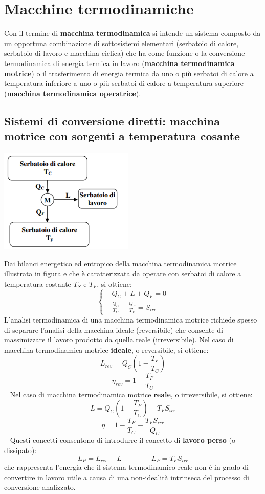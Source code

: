 \section{Macchine termodinamiche}
Con il termine di \textbf{macchina termodinamica} si intende un sistema composto da un opportuna
combinazione di sottosistemi elementari (serbatoio di calore, serbatoio di lavoro e macchina
ciclica) che ha come funzione o la conversione termodinamica di energia termica in lavoro
(\textbf{macchina termodinamica motrice}) o il trasferimento di energia termica da uno o più serbatoi
di calore a temperatura inferiore a uno o più serbatoi di calore a temperatura superiore
(\textbf{macchina termodinamica operatrice}). 
\subsection{Sistemi di conversione diretti: macchina motrice con sorgenti a temperatura cosante}
\begin{center}
    \includegraphics[height=5cm]{../NOTE SUGLI ESERCIZI/img4.PNG}
\end{center}
Dai bilanci energetico ed entropico della macchina termodinamica motrice illustrata in figura
e che è caratterizzata da operare con serbatoi di calore a temperatura costante $T_S$ e $T_F$, si
ottiene: 
\[
    \begin{cases}
        -Q_C + L + Q_F = 0\\
        - \frac{Q_C}{T_C} + \frac{Q_F}{T_F} = S_{irr}
    \end{cases}
\]
L’analisi termodinamica di una macchina termodinamica motrice richiede spesso di separare
l’analisi della macchina ideale (reversibile) che consente di massimizzare il lavoro prodotto
da quella reale (irreversibile). \newline
\newline
Nel caso di macchina termodinamica motrice \textbf{ideale}, o reversibile, si ottiene: 
\[
    L_{rev} = Q_C \left(1- \frac{T_F}{T_C}\right)
\]
\[
    \eta_{rev} = 1- \frac{T_F}{T_C}
\]
\ \newline
Nel caso di macchina termodinamica motrice \textbf{reale}, o irreversibile, si ottiene:
\[
    L  = Q_C \left(1- \frac{T_F}{T_C}\right) - T_FS_{irr}
\]
\[
    \eta =1-\frac{T_F}{T_C} - \frac{T_F S_{irr}}{Q_C}
\]
\ \newline
Questi concetti consentono di introdurre il concetto di \textbf{lavoro perso} (o dissipato):
\[
    L_P = L_{rev} - L \;\;\;\;\;\;\;\;\;\;\;\;\;\;\;L_{P} = T_FS_{irr}
\]
che rappresenta l’energia che il sistema termodinamico reale non è in grado di convertire in
lavoro utile a causa di una non-idealità intrinseca del processo di conversione analizzato.
